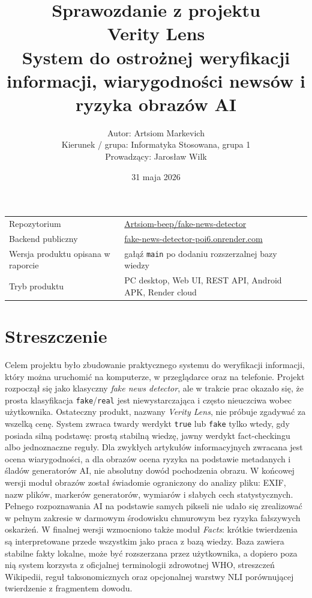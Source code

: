 \documentclass[12pt,a4paper]{article}
\title{\textbf{Sprawozdanie z projektu}\\[0.35cm]
\textbf{Verity Lens}\\
\large System do ostrożnej weryfikacji informacji, wiarygodności newsów i ryzyka obrazów AI}
\author{
Autor: Artsiom Markevich\\
Kierunek / grupa: Informatyka Stosowana, grupa 1\\
Prowadzący: Jarosław Wilk
}
\date{31 maja 2026}
\begin{document}
\maketitle
\thispagestyle{empty}

\vfill
\begin{center}
\begin{tabularx}{\textwidth}{p{}Y}
\toprule
Repozytorium & \href{https://github.com/Artsiom-beep/fake-news-detector.git}{Artsiom-beep/fake-news-detector} \\
Backend publiczny & \href{https://fake-news-detector-poi6.onrender.com}{fake-news-detector-poi6.onrender.com} \\
Wersja produktu opisana w raporcie & gałąź \texttt{main} po dodaniu rozszerzalnej bazy wiedzy \\
Tryb produktu & PC desktop, Web UI, REST API, Android APK, Render cloud \\
\bottomrule
\end{tabularx}
\end{center}
\vfill

\newpage
\tableofcontents
\newpage

\section*{Streszczenie}
Celem projektu było zbudowanie praktycznego systemu do weryfikacji informacji, który można uruchomić na komputerze, w przeglądarce oraz na telefonie.
Projekt rozpoczął się jako klasyczny \textit{fake news detector}, ale w trakcie prac okazało się, że prosta klasyfikacja \texttt{fake}/\texttt{real} jest niewystarczająca i często nieuczciwa wobec użytkownika.
Ostateczny produkt, nazwany \textit{Verity Lens}, nie próbuje zgadywać za wszelką cenę.
System zwraca twardy werdykt \texttt{true} lub \texttt{fake} tylko wtedy, gdy posiada silną podstawę: prostą stabilną wiedzę, jawny werdykt fact-checkingu albo jednoznaczne reguły.
Dla zwykłych artykułów informacyjnych zwracana jest ocena wiarygodności, a dla obrazów ocena ryzyka na podstawie metadanych i śladów generatorów AI, nie absolutny dowód pochodzenia obrazu.
W końcowej wersji moduł obrazów został świadomie ograniczony do analizy pliku: EXIF, nazw plików, markerów generatorów, wymiarów i słabych cech statystycznych.
Pełnego rozpoznawania AI na podstawie samych pikseli nie udało się zrealizować w pełnym zakresie w darmowym środowisku chmurowym bez ryzyka fałszywych oskarżeń.
W finalnej wersji wzmocniono także moduł \textit{Facts}: krótkie twierdzenia są interpretowane przede wszystkim jako praca z bazą wiedzy.
Baza zawiera stabilne fakty lokalne, może być rozszerzana przez użytkownika, a dopiero poza nią system korzysta z oficjalnej terminologii zdrowotnej WHO, streszczeń Wikipedii, reguł taksonomicznych oraz opcjonalnej warstwy NLI porównującej twierdzenie z fragmentem dowodu.
\end{document}
